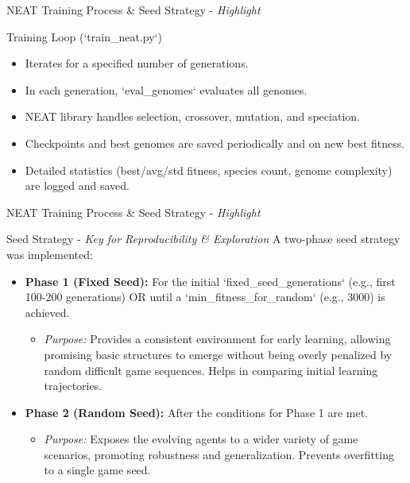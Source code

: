 \documentclass{beamer}
\begin{document}
\begin{frame}{NEAT Training Process \& Seed Strategy - \textit{Highlight}}
  \begin{block}{Training Loop (`train\_neat.py`)}
    \begin{itemize}
        \item Iterates for a specified number of generations.
        \item In each generation, `eval\_genomes` evaluates all genomes.
        \item NEAT library handles selection, crossover, mutation, and speciation.
        \item Checkpoints and best genomes are saved periodically and on new best fitness.
        \item Detailed statistics (best/avg/std fitness, species count, genome complexity) are logged and saved.
    \end{itemize}
  \end{block}
\end{frame}

\begin{frame}{NEAT Training Process \& Seed Strategy - \textit{Highlight}}
  \begin{block}{Seed Strategy - \textit{Key for Reproducibility \& Exploration}}
    A two-phase seed strategy was implemented:
    \begin{itemize}
        \item \textbf{Phase 1 (Fixed Seed):} For the initial `fixed\_seed\_generations` (e.g., first 100-200 generations) OR until a `min\_fitness\_for\_random` (e.g., 3000) is achieved.
            \begin{itemize}
                \item \textit{Purpose:} Provides a consistent environment for early learning, allowing promising basic structures to emerge without being overly penalized by random difficult game sequences. Helps in comparing initial learning trajectories.
            \end{itemize}
        \item \textbf{Phase 2 (Random Seed):} After the conditions for Phase 1 are met.
            \begin{itemize}
                \item \textit{Purpose:} Exposes the evolving agents to a wider variety of game scenarios, promoting robustness and generalization. Prevents overfitting to a single game seed.
            \end{itemize}
    \end{itemize}
  \end{block}
\end{frame}
\end{document}

